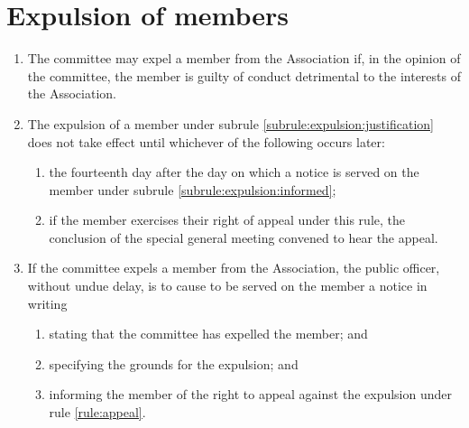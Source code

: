 \section{Expulsion of members}
\label{rule:expulsion}

\begin{enumerate}
	\item \label{subrule:expulsion:justification} The committee may expel a member from the Association if, in the opinion of the committee, the member is guilty of conduct detrimental to the interests of the Association.

	\item The expulsion of a member under subrule \ref{subrule:expulsion:justification} does not take effect until whichever of the following occurs later:
		\begin{enumerate}
			\item the fourteenth day after the day on which a notice is served on the member under subrule \ref{subrule:expulsion:informed};
			\item if the member exercises their right of appeal under this rule, the conclusion of the special general meeting convened to hear the appeal.
		\end{enumerate}
		
	\item \label{subrule:expulsion:informed} If the committee expels a member from the Association, the public officer, without undue delay, is to cause to be served on the member a notice in writing
		\begin{enumerate}
			\item stating that the committee has expelled the member; and
			\item specifying the grounds for the expulsion; and
			\item informing the member of the right to appeal against the expulsion under rule \ref{rule:appeal}.
		\end{enumerate}
\end{enumerate}